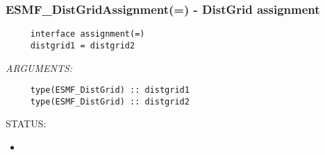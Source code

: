  
\setlength{\oldparskip}{\parskip}
\setlength{\parskip}{1.5ex}
\setlength{\oldparindent}{\parindent}
\setlength{\parindent}{0pt}
\setlength{\oldbaselineskip}{\baselineskip}
\setlength{\baselineskip}{11pt}
 
\def\bv{\begin{verbatim}}
\def\ev{\end{verbatim}}
\def\be{\begin{equation}}
\def\ee{\end{equation}}
\def\bea{\begin{eqnarray}}
\def\eea{\end{eqnarray}}
\def\bi{\begin{itemize}}
\def\ei{\end{itemize}}
\def\bn{\begin{enumerate}}
\def\en{\end{enumerate}}
\def\bd{\begin{description}}
\def\ed{\end{description}}
\def\({\left (}
\def\){\right )}
\def\[{\left [}
\def\]{\right ]}
\def\<{\left  \langle}
\def\>{\right \rangle}
\def\cI{{\cal I}}
\def\diag{\mathop{\rm diag}}
\def\tr{\mathop{\rm tr}}


 
\subsubsection [ESMF\_DistGridAssignment(=)] {ESMF\_DistGridAssignment(=) - DistGrid assignment}


  
\begin{verbatim}     interface assignment(=)
     distgrid1 = distgrid2\end{verbatim}{\em ARGUMENTS:}
\begin{verbatim}     type(ESMF_DistGrid) :: distgrid1
     type(ESMF_DistGrid) :: distgrid2\end{verbatim}
{\sf STATUS:}
   \begin{itemize}
   \item{}
   \end{itemize}
  
